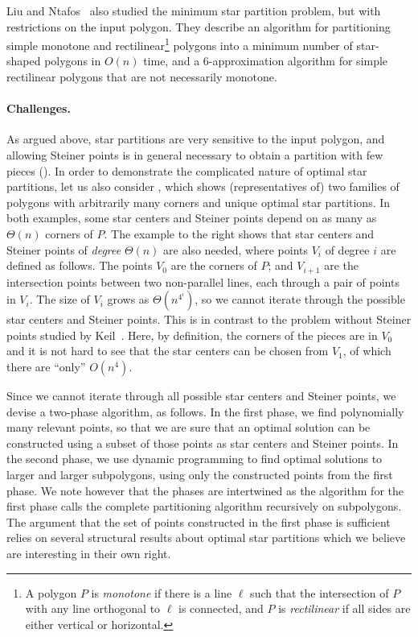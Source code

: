 \documentclass[10pt,a4paper]{article}
\begin{document}
Liu and Ntafos~\cite{DBLP:journals/algorithmica/LiuN91} also studied the minimum star partition problem, but with restrictions on the input polygon. They describe an algorithm for partitioning simple monotone and rectilinear\footnote{A polygon $P$ is \emph{monotone} if there is a line $\ell$ such that the intersection of $P$ with any line orthogonal to $\ell$ is connected, and $P$ is \emph{rectilinear} if all sides are either vertical or horizontal.} polygons into a minimum number of star-shaped polygons in $O(n)$ time, and a $6$-approximation algorithm for simple rectilinear polygons that are not necessarily monotone.



\paragraph{Challenges.}
As argued above, star partitions are very sensitive to the input polygon, and allowing Steiner points is in general necessary to obtain a partition with few pieces (). In order to demonstrate the complicated nature of optimal star partitions, let us also consider , which shows (representatives of) two families of polygons with arbitrarily many corners and unique optimal star partitions.
In both examples, some star centers and Steiner points depend on as many as $\Theta(n)$ corners of $P$.
The example to the right shows that star centers and Steiner points of \emph{degree} $\Theta(n)$ are also needed, where points $V_i$ of degree $i$ are defined as follows.
The points $V_0$ are the corners of $P$; and $V_{i+1}$ are the intersection points between two non-parallel lines, each through a pair of points in $V_i$.
The size of $V_i$ grows as $\Theta(n^{4^i})$, so we cannot iterate through the possible star centers and Steiner points.
This is in contrast to the problem without Steiner points studied by Keil~\cite{DBLP:journals/siamcomp/Keil85}.
Here, by definition, the corners of the pieces are in $V_0$ and it is not hard to see that the star centers can be chosen from $V_1$, of which there are ``only'' $O(n^4)$.

Since we cannot iterate through all possible star centers and Steiner points, we devise a two-phase algorithm, as follows.
In the first phase, we find polynomially many relevant points, so that we are sure that an optimal solution can be constructed using a subset of those points as star centers and Steiner points.
In the second phase, we use dynamic programming to find optimal solutions to larger and larger subpolygons, using only the constructed points from the first phase.
We note however that the phases are intertwined as the algorithm for the first phase calls the complete partitioning algorithm recursively on subpolygons.
The argument that the set of points constructed in the first phase is sufficient relies on several structural results about optimal star partitions which we believe are interesting in their own right.
\end{document}
